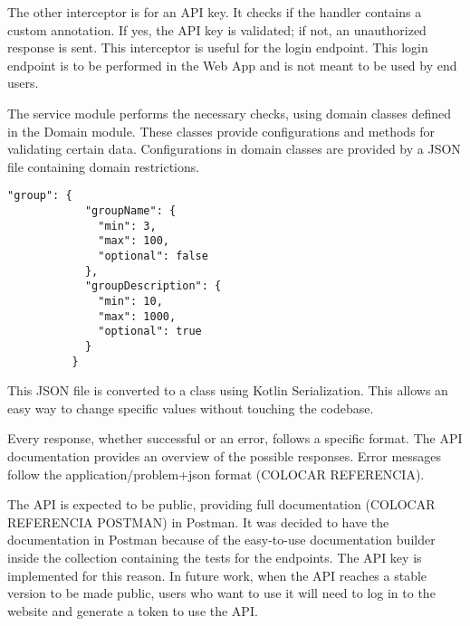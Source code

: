 The other interceptor is for an API key. It checks if the handler contains a custom annotation. If yes, the API key is validated; if not, an unauthorized response is sent. This interceptor is useful for the login endpoint. This login endpoint is to be performed in the Web App and is not meant to be used by end users.

The service module performs the necessary checks, using domain classes defined in the Domain module. These classes provide configurations and methods for validating certain data. Configurations in domain classes are provided by a JSON file containing domain restrictions.

\begin{center}
    \begin{lstlisting}[caption={Example of the group entry}]
        "group": {
            "groupName": {
              "min": 3,
              "max": 100,
              "optional": false
            },
            "groupDescription": {
              "min": 10,
              "max": 1000,
              "optional": true
            }
          }
    \end{lstlisting}
\end{center}

This JSON file is converted to a class using Kotlin Serialization. This allows an easy way to change specific values without touching the codebase.

\vspace{3mm}

Every response, whether successful or an error, follows a specific format. The API documentation provides an overview of the possible responses. Error messages follow the application/problem+json format (COLOCAR REFERENCIA).

\vspace{3mm}

The API is expected to be public, providing full documentation (COLOCAR REFERENCIA POSTMAN) in Postman. It was decided to have the documentation in Postman because of the easy-to-use documentation builder inside the collection containing the tests for the endpoints. The API key is implemented for this reason. In future work, when the API reaches a stable version to be made public, users who want to use it will need to log in to the website and generate a token to use the API.





